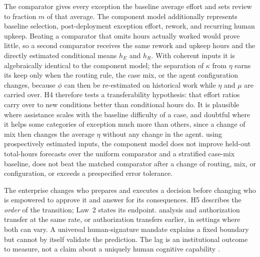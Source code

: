  The comparator gives every exception the baseline
average effort and sets review to fraction $m$ of that average. The component model additionally represents baseline selection, post-deployment exception effort,
rework, and recurring human upkeep. Beating a comparator that omits hours actually worked would prove
little, so a second comparator receives the same rework and upkeep hours and the directly estimated
conditional means $h_E$ and $h_R$. With coherent inputs it is algebraically identical to the component
model; the separation of $\kappa$ from $\eta$ earns its keep only when the routing rule, the case mix,
or the agent configuration changes, because $\phi$ can then be re-estimated on historical work while
$\eta$ and $\mu$ are carried over. H4 therefore tests a transferability hypothesis: that effort ratios
carry over to new conditions better than conditional hours do. It is plausible where assistance scales
with the baseline difficulty of a case, and doubtful where it helps some categories of exception much
more than others, since a change of mix then changes the average $\eta$ without any change in the
agent.
 using prospectively estimated inputs, the component model does not
improve held-out total-hours forecasts over the uniform comparator and a stratified case-mix baseline,
does not beat the matched comparator after a change of routing, mix, or configuration, or exceeds a
prespecified error tolerance.

 The enterprise changes who prepares and executes
a decision before changing who is empowered to approve it and answer for its consequences. H5
describes the \emph{order} of the transition; Law~2 states its endpoint.
 analysis and authorization transfer at the same rate, or authorization
transfers earlier, in settings where both can vary. A universal human-signature mandate explains a
fixed boundary but cannot by itself validate the prediction. The lag is an institutional outcome to
measure, not a claim about a uniquely human cognitive capability \citep{novelli2024}.

